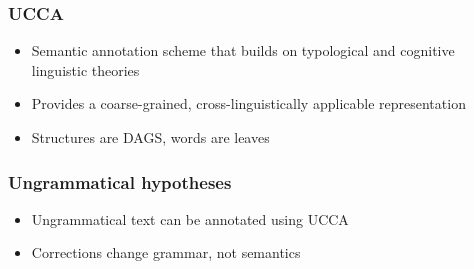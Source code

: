\documentclass{beamer}
\newcommand{\com}[1]{}
\begin{document}
\begin{frame}
	\frametitle{UCCA}
	\begin{itemize}
		\item Semantic annotation scheme that builds on
		typological and cognitive linguistic theories
		\item Provides a coarse-grained, cross-linguistically
		applicable representation
		\item Structures are DAGS, words are leaves
	\end{itemize}
\end{frame}
\com{
\begin{frame}[label=distances-details]
	\frametitle{Measures}
	\begin{itemize}
		\item IAA - percentage of Nodes with same label and leaves
		\item UCCASim - percentage of Nodes with same label and most matched leaves
		\item Top down - size of the biggest cut
		\item Token - Consider only main entities
		\item (Labeled) Tree edit - tree distance when ordered by tokens alignment 
	\end{itemize}
	\hyperlink{distances}{\beamerbutton{distances table}}
\end{frame}
}
\begin{frame}[label=UCCA]
	\frametitle{Ungrammatical hypotheses}
	\begin{itemize}
		\item Ungrammatical text can be annotated using UCCA
		\item Corrections change grammar, not semantics
	\end{itemize}
\end{frame}
\end{document}
